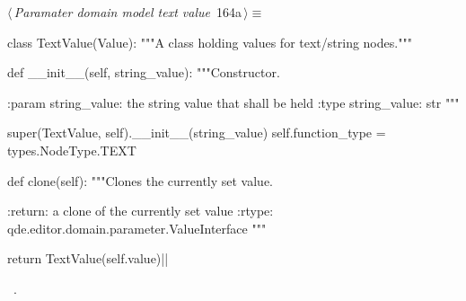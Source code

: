 \documentclass[%
    a4paper,    %
    justified,  %
    nobib,      %
    openany     %
]{tufte-book}
\begin{document}
\begin{flushleft} \small
\begin{minipage}{\linewidth}\label{scrap181}\raggedright\small
{} $\langle\,${\itshape Paramater domain model text value}\nobreak\ {\footnotesize {164a}}$\,\rangle\equiv$
\vspace{-1ex}
\begin{pythoncode}
class TextValue(Value):
    """A class holding values for text/string nodes."""

    def __init__(self, string_value):
        """Constructor.

        :param string_value: the string value that shall be held
        :type  string_value: str
        """

        super(TextValue, self).__init__(string_value)
        self.function_type = types.NodeType.TEXT

    def clone(self):
        """Clones the currently set value.

        :return: a clone of the currently set value
        :rtype:  qde.editor.domain.parameter.ValueInterface
        """

        return TextValue(self.value)|\NWsep|
\end{pythoncode}
\vspace{1.5ex}
\footnotesize
\begin{list}{}{\setlength{\itemsep}{-\parsep}\setlength{\itemindent}{-\leftmargin}}
\item \NWtxtMacroRefIn\ .

\item{}
\end{list}
\end{minipage}\vspace{4ex}
\end{flushleft}
\end{document}
